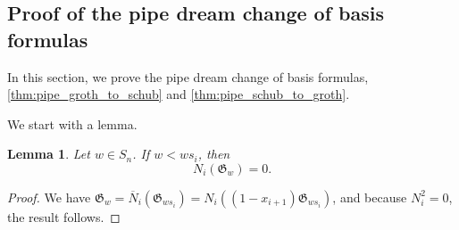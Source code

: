 \documentclass[12 pt]{amsart}
\newtheorem{lemma}[Theorem]{Lemma}
\numberwithin{equation}{section}
\theoremstyle{remark}
\newcommand{\divdiff}{N}
\newcommand{\kdivdiff}{\overline{N}}
\begin{document}
		\subsection{Proof of the pipe dream change of basis formulas}
		
		In this section, we prove the pipe dream change of basis formulas, \cref{thm:pipe_groth_to_schub} and \cref{thm:pipe_schub_to_groth}.
		
		We start with a lemma.
		\begin{lemma}
			\label{eq:grothorddivdiff}
			Let $w \in S_n$. If $w < ws_i$, then 
			\[\divdiff_i(\mathfrak{G}_{w}) = 0.\]
		\end{lemma}
		\begin{proof}
			We have $\mathfrak{G}_{w} = \kdivdiff_i(\mathfrak{G}_{ws_i}) = \divdiff_i\left((1 - x_{i + 1})\mathfrak{G}_{ws_i}\right)$, and because $\divdiff_i^2 = 0$, the result follows.
		\end{proof}
		
\end{document}
